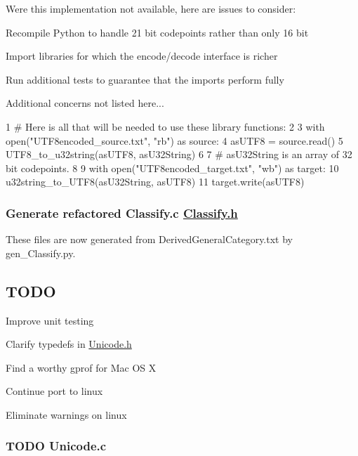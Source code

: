 Were this implementation not available, here are issues to consider\+:
\begin{DoxyItemize}
\item Recompile Python to handle 21 bit codepoints rather than only 16 bit
\item Import libraries for which the encode/decode interface is richer
\item Run additional tests to guarantee that the imports perform fully
\item Additional concerns not listed here...
\end{DoxyItemize}


\begin{DoxyCode}
1 # Here is all that will be needed to use these library functions:
2 
3 with open("UTF8encoded\_source.txt", "rb") as source:
4     asUTF8 = source.read()
5     UTF8\_to\_u32string(asUTF8, asU32String)
6 
7 # asU32String is an array of 32 bit codepoints.
8 
9 with open("UTF8encoded\_target.txt", "wb") as target:
10     u32string\_to\_UTF8(asU32String, asUTF8)
11     target.write(asUTF8)
\end{DoxyCode}


\subsubsection*{Generate refactored Classify.\+c \hyperlink{_classify_8h_source}{Classify.\+h}}

These files are now generated from Derived\+General\+Category.\+txt by gen\+\_\+\+Classify.\+py.

\subsection*{T\+O\+DO}


\begin{DoxyItemize}
\item Improve unit testing
\item Clarify typedefs in \hyperlink{_unicode_8h_source}{Unicode.\+h}
\item Find a worthy gprof for Mac OS X
\item Continue port to linux
\item Eliminate warnings on linux
\end{DoxyItemize}

\subsubsection*{T\+O\+DO Unicode.\+c}


